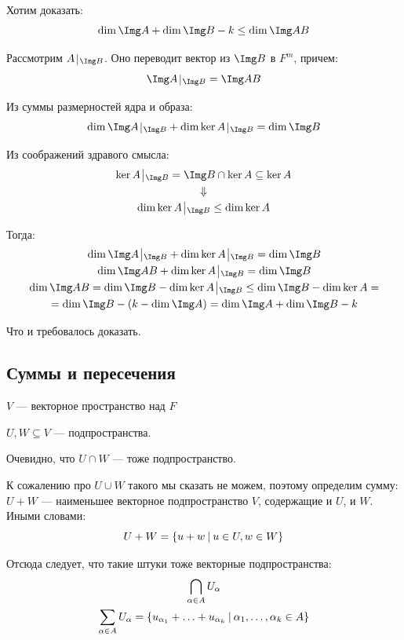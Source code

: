 Хотим доказать:
\[
    \dim \Img A + \dim \Img B - k \leq \dim \Img AB
\]

Рассмотрим \( A \: \vline_{\: \Img B} \).
Оно переводит вектор из \( \Img B \) в \( F^m \),
причем:
\[
    \Img A \: \vline_{\: \Img B} = \Img AB
\]

Из суммы размерностей ядра и образа:
\[
    \dim \Img A \: \vline_{\: \Img B} + \dim \ker A \: \vline_{\: \Img B} = \dim \Img B
\]

Из соображений здравого смысла:
\begin{gather*}
    \ker A \: \vline_{\: \Img B} = \Img B \cap \ker A \subseteq \ker A
    \\
    \Downarrow
    \\
    \dim \ker A \: \vline_{\: \Img B} \leq \dim \ker A
\end{gather*}

Тогда:
\begin{gather*}
    \dim \Img A \: \vline_{\: \Img B} + \dim \ker A \: \vline_{\: \Img B} = \dim \Img B
    \\
    \dim \Img AB + \dim \ker A \: \vline_{\: \Img B} = \dim \Img B
    \\
    \dim \Img AB
        = \dim \Img B - \dim \ker A \: \vline_{\: \Img B}
        \leq \dim \Img B - \dim \ker A
        = \\
        = \dim \Img B - (k - \dim \Img A)
        = \dim \Img A + \dim \Img B - k
\end{gather*}

Что и требовалось доказать.

\subsection{Суммы и пересечения}

\( V \) --- векторное пространство над \( F \)

\( U, W \subseteq V \) --- подпространства.

Очевидно, что \( U \cap W \) --- тоже подпространство.

К сожалению про \( U \cup W \) такого мы сказать не можем,
поэтому определим сумму:
\( U + W \) --- наименьшее векторное подпространство \( V \),
содержащие и \( U \), и \( W \). Иными словами:
\[
    U + W = \{ u + w \ \vline \ u \in U, w \in W \}
\]

Отсюда следует, что такие штуки тоже векторные подпространства:
\begin{gather*}
    \bigcap\limits_{ \alpha \in A } U_\alpha
    \\
    \sum\limits_{ \alpha \in A } U_\alpha = { \{ u_{\alpha_1} + \ldots + u_{\alpha_k} \ \vline \ \alpha_1, \ldots, \alpha_k \in A \} }
\end{gather*}

